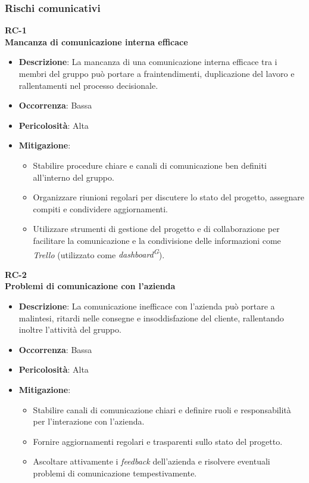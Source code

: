 \documentclass[5pt]{article}
\begin{document}
\subsubsection{Rischi comunicativi}
\textbf{RC-1}\\
\textbf{Mancanza di comunicazione interna efficace}
\begin{itemize}
  \item \textbf{Descrizione}: La mancanza di una comunicazione interna efficace tra i membri del gruppo può portare a fraintendimenti, duplicazione del lavoro e rallentamenti nel processo decisionale.
  \item \textbf{Occorrenza}: Bassa
  \item \textbf{Pericolosità}: Alta
  \item \textbf{Mitigazione}: 
    \begin{itemize}
      \item Stabilire procedure chiare e canali di comunicazione ben definiti all'interno del gruppo.
      \item Organizzare riunioni regolari per discutere lo stato del progetto, assegnare compiti e condividere aggiornamenti.
      \item Utilizzare strumenti di gestione del progetto e di collaborazione per facilitare la comunicazione e 
      la condivisione delle informazioni come \textit{Trello} (utilizzato come \textit{dashboard\textsuperscript{G}}).
    \end{itemize}
\end{itemize}
\textbf{RC-2}\\
\textbf{Problemi di comunicazione con l'azienda}
\begin{itemize}
  \item \textbf{Descrizione}: La comunicazione inefficace con l'azienda può portare a malintesi, ritardi nelle consegne e insoddisfazione del cliente, rallentando inoltre l'attività del gruppo.
  \item \textbf{Occorrenza}: Bassa
  \item \textbf{Pericolosità}: Alta
  \item \textbf{Mitigazione}: 
    \begin{itemize}
      \item Stabilire canali di comunicazione chiari e definire ruoli e responsabilità per l'interazione con l'azienda.
      \item Fornire aggiornamenti regolari e trasparenti sullo stato del progetto.
      \item Ascoltare attivamente i \textit{feedback} dell'azienda e risolvere eventuali problemi di comunicazione tempestivamente.
    \end{itemize}
\end{itemize}
\end{document}
